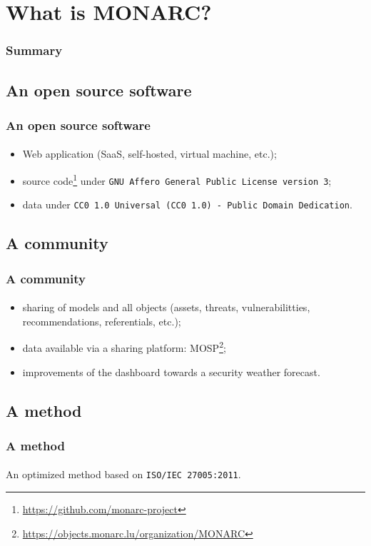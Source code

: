%
%
\section{What is MONARC?}
\begin{frame}
    \frametitle{Summary}
\end{frame}
\subsection{An open source software}
\begin{frame}
\frametitle{An open source software}
\framesubtitle{}
    \begin{itemize}
        \item Web application (SaaS, self-hosted, virtual machine, etc.);
        \item source code\footnote{\url{https://github.com/monarc-project}} under \texttt{GNU Affero General Public License version 3};
        \item data under \texttt{CC0 1.0 Universal (CC0 1.0) - Public Domain Dedication}.
    \end{itemize}
\end{frame}

\subsection{A community}
\begin{frame}
\frametitle{A community}
\framesubtitle{}
    \begin{itemize}
        \item sharing of models and all objects (assets, threats, vulnerabilitties, recommendations, referentials, etc.);
        \item data available via a sharing platform: MOSP\footnote{\url{https://objects.monarc.lu/organization/MONARC}};
        \item improvements of the dashboard towards a security weather forecast.
    \end{itemize}
\end{frame}

\subsection{A method}
\begin{frame}
\frametitle{A method}
\framesubtitle{}
    An optimized method based on \texttt{ISO/IEC 27005:2011}.
\end{frame}
